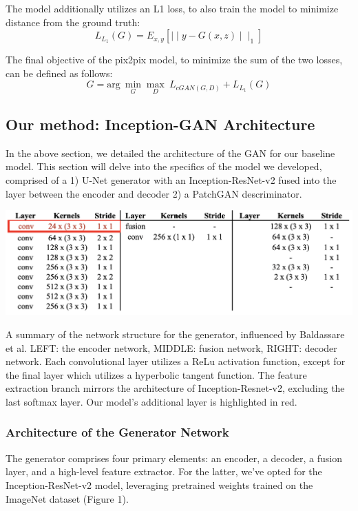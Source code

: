 \documentclass[10pt,twocolumn,letterpaper]{article}
\begin{document}
The model additionally utilizes an L1 loss, to also train the model to minimize distance from the ground truth:
 \begin{equation}
 \textit{L}_{L_1}(G) = E_{x, y} [\mid\mid y-G(x,z)\mid\mid_1
 ] \end{equation}

 The final objective of the pix2pix model, to minimize the sum of the two losses, can be defined as follows:
 \begin{equation}
 G = \text{arg}\ \min_{G} \max_{D}\ L_{cGAN(G, D)} + L_{L_1}(G)
 \end{equation}

\subsection{Our method: Inception-GAN Architecture}
In the above section, we detailed the architecture of the GAN for our baseline model. This section will delve into the specifics of the model we developed, comprised of a 1) U-Net generator with an Inception-ResNet-v2 fused into the layer between the encoder and decoder 2) a PatchGAN descriminator.

\begin{table}[]
    \centering
    \includegraphics[width=1\linewidth]{layers.png}
    \caption{A summary of the network structure for the generator, influenced by Baldassare et al. LEFT: the encoder network, MIDDLE: fusion network, RIGHT: decoder network. Each convolutional layer utilizes a ReLu activation function, except for the final layer which utilizes a hyperbolic tangent function. The feature extraction branch mirrors the architecture of Inception-Resnet-v2, excluding the last softmax layer. Our model's additional layer is highlighted in red.}
    \label{tab:my_label}
\end{table}

\subsubsection{Architecture of the Generator Network}
 The generator comprises four primary elements: an encoder, a decoder, a fusion layer, and a high-level feature extractor. For the latter, we've opted for the Inception-ResNet-v2 model, leveraging pretrained weights trained on the ImageNet dataset (Figure 1). 
\end{document}
